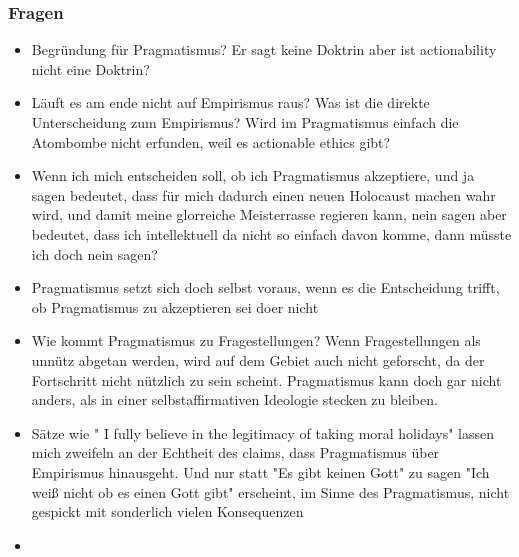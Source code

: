 \documentclass[emulatestandardclasses]{scrartcl}
\begin{document}
\subsubsection{Fragen}

\begin{itemize}
  \item Begründung für Pragmatismus? Er sagt keine Doktrin aber ist actionability nicht eine Doktrin?
  \item Läuft es am ende nicht auf Empirismus raus? Was ist die direkte Unterscheidung zum Empirismus? Wird im Pragmatismus einfach die Atombombe nicht erfunden, weil es actionable ethics gibt?
  \item Wenn ich mich entscheiden soll, ob ich Pragmatismus akzeptiere, und ja sagen bedeutet, dass für mich dadurch einen neuen Holocaust machen wahr wird, und damit meine glorreiche Meisterrasse regieren kann, nein sagen aber bedeutet, dass ich intellektuell da nicht so einfach davon komme, dann müsste ich doch nein sagen?
  \item Pragmatismus setzt sich doch selbst voraus, wenn es die Entscheidung trifft, ob Pragmatismus zu akzeptieren sei doer nicht
  \item Wie kommt Pragmatismus zu Fragestellungen? Wenn Fragestellungen als unnütz abgetan werden, wird auf dem Gebiet auch nicht geforscht, da der Fortschritt nicht nützlich zu sein scheint. Pragmatismus kann doch gar nicht anders, als in einer selbstaffirmativen Ideologie stecken zu bleiben.
  \item Sätze wie " I fully believe in the legitimacy of taking moral holidays" lassen mich zweifeln an der Echtheit des claims, dass Pragmatismus über Empirismus hinausgeht. Und nur statt "Es gibt keinen Gott" zu sagen "Ich weiß nicht ob es einen Gott gibt" erscheint, im Sinne des Pragmatismus, nicht gespickt mit sonderlich vielen Konsequenzen
  \item 
\end{itemize}


\newpage
%


\end{document}
